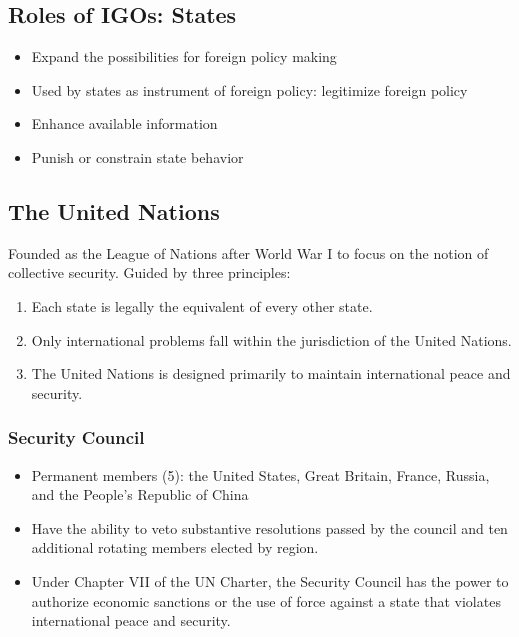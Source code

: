 \documentclass[
]{book}
\begin{document}
\hypertarget{roles-of-igos-states}{%
\subsection{Roles of IGOs: States}\label{roles-of-igos-states}}

\begin{itemize}
\item
  Expand the possibilities for foreign policy making
\item
  Used by states as instrument of foreign policy: legitimize foreign policy
\item
  Enhance available information
\item
  Punish or constrain state behavior
\end{itemize}

\hypertarget{the-united-nations}{%
\subsection{The United Nations}\label{the-united-nations}}

Founded as the League of Nations after World War I to focus on the notion of collective security. Guided by three principles:

\begin{enumerate}
\def\labelenumi{\arabic{enumi}.}
\item
  Each state is legally the equivalent of every other state.
\item
  Only international problems fall within the jurisdiction of the United Nations.
\item
  The United Nations is designed primarily to maintain international peace and security.
\end{enumerate}

\hypertarget{security-council}{%
\subsubsection{Security Council}\label{security-council}}

\begin{itemize}
\item
  Permanent members (5): the United States, Great Britain, France, Russia, and the People's Republic of China
\item
  Have the ability to veto substantive resolutions passed by the council and ten additional rotating members elected by region.
\item
  Under Chapter VII of the UN Charter, the Security Council has the power to authorize economic sanctions or the use of force against a state that violates international peace and security.
\end{itemize}
\end{document}
